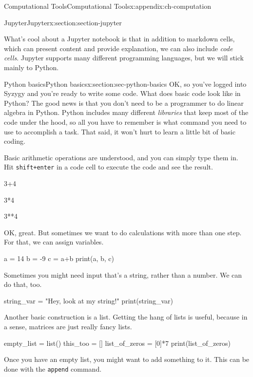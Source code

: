 \documentclass[oneside,10pt,]{book}
\newcommand{\mono}[1]{\texttt{#1}}
\numberwithin{equation}{section}
\begin{document}
\begin{appendixptx}{Computational Tools}{}{Computational Tools}{}{}{x:appendix:ch-computation}
\begin{sectionptx}{Jupyter}{}{Jupyter}{}{}{x:section:section-jupyter}
\par
What's cool about a Jupyter notebook is that in addition to markdown cells, which can present content and provide explanation, we can also include \emph{code cells}. Jupyter supports many different programming languages, but we will stick mainly to Python.%
\end{sectionptx}
%
%
\typeout{************************************************}
\typeout{************************************************}
%
\begin{sectionptx}{Python basics}{}{Python basics}{}{}{x:section:sec-python-basics}
OK, so you've logged into Syzygy and you're ready to write some code. What does basic code look like in Python? The good news is that you don't need to be a programmer to do linear algebra in Python. Python includes many different \emph{libraries} that keep most of the code under the hood, so all you have to remember is what command you need to use to accomplish a task. That said, it won't hurt to learn a little bit of basic coding.%
\par
Basic arithmetic operations are understood, and you can simply type them in. Hit \mono{shift+enter} in a code cell to execute the code and see the result.%
\begin{sageinput}
3+4
\end{sageinput}
\begin{sageinput}
3*4
\end{sageinput}
\begin{sageinput}
3**4
\end{sageinput}
OK, great. But sometimes we want to do calculations with more than one step. For that, we can assign variables.%
\begin{sageinput}
a = 14
b = -9
c = a+b
print(a, b, c)
\end{sageinput}
Sometimes you might need input that's a string, rather than a number. We can do that, too.%
\begin{sageinput}
string_var = "Hey, look at my string!"
print(string_var)
\end{sageinput}
Another basic construction is a list. Getting the hang of lists is useful, because in a sense, matrices are just really fancy lists.%
\begin{sageinput}
empty_list = list()
this_too = []
list_of_zeros = [0]*7
print(list_of_zeros)
\end{sageinput}
Once you have an empty list, you might want to add something to it. This can be done with the \mono{append} command.%

\end{sectionptx}
\end{appendixptx}
\end{document}
